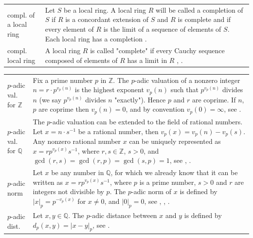 \documentclass[12pt]{amsart}
\theoremstyle{definition}
\begin{document}
{\begin{table}[H]
\begin{tabular}{|P{1.4cm} p{13.4cm}|}
		\\
		compl. of a local ring & Let $S$ be a local ring. A local ring $R$ will be called a completion of $S$ if $R$ is a concordant extension of $S$ and $R$ is complete and if every element of $R$ is the limit of a sequence of elements of $S$. Each local ring has a completion \cite[p.~92]{Ref_Northcott_1953}.	 
		\\
		compl. local ring & A local ring $R$ is called "complete" if every Cauchy sequence composed of elements of $R$ has a limit in $R$ \cite[p.~85]{Ref_Northcott_1953}, \cite[p.~184]{Ref_Kemper_2011}.
		\\ \hline
	\end{tabular}
\end{table}}

{\renewcommand{\arraystretch}{1.8}
\begin{table}[H]
	\centering
	\begin{tabular}{|P{1.4cm} p{13.4cm}|}
		\hline
		$p$-adic val. for $\mathbb{Z}$ & Fix a prime number $p$ in $\mathbb{Z}$. The $p$-adic valuation of a nonzero integer $n=r\cdot p^{v_p(n)}$ is the highest exponent $v_p(n)$ such that $p^{v_p(n)}$ divides $n$ (we say $p^{v_p(n)}$ divides $n$ "exactly"). Hence $p$ and $r$ are coprime. If $n$, $p$ are coprime then $v_p(n)=0$, and by convention $v_p(0)=\infty$, see \cite{Ref_Herwig_2011}.
		\\
		$p$-adic val. for $\mathbb{Q}$ & The $p$-adic valuation can be extended to the field of rational numbers. Let $x=n\cdot s^{-1}$ be a rational number, then $v_p(x)=v_p(n)-v_p(s)$. Any nonzero rational number $x$ can be uniquely represented as $x=rp^{v_p(x)}s^{-1}$, where $r,s\in\mathbb{Z}$, $s>0$, and $\gcd(r,s)=\gcd(r,p)=\gcd(s,p)=1$, see \cite[p.~154]{Ref_Schmidt_2007}, \cite{Ref_Weisstein_1}.
		\\
		$p$-adic norm & Let $x$ be any number in $\mathbb{Q}$, for which we already know that it can be written as $x=rp^{v_p(x)}s^{-1}$, where $p$ is a prime number, $s>0$ and $r$ are integers not divisible by $p$. The $p$-adic norm of $x$ is defined by $|x|_p=p^{-v_p(x)}$ for $x\ne0$, and $|0|_p=0$, see \cite{Ref_Herwig_2011}, \cite[p.~154]{Ref_Schmidt_2007}, \cite{Ref_Weisstein_2}.
		\\
		$p$-adic dist. &  Let $x,y\in\mathbb{Q}$. The $p$-adic distance between $x$ and $y$ is defined by $d_p(x,y)=|x-y|_p$, see \cite[p.~155]{Ref_Schmidt_2007}.
		\\

\end{tabular}
\end{table}}
\end{document}
